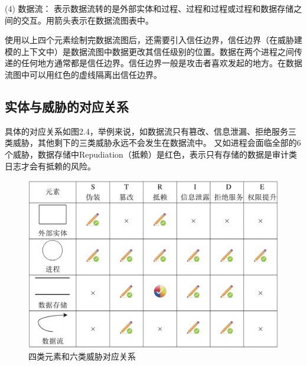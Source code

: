 (4) 数据流：
表示数据流转的是外部实体和过程、过程和过程或过程和数据存储之间的交互。用箭头表示在数据流图表中。

使用以上四个元素绘制完数据流图后，还需要引入信任边界，信任边界（在威胁建模的上下文中）是数据流图中数据更改其信任级别的位置。数据在两个进程之间传递的任何地方通常都是信任边界。信任边界一般是攻击者喜欢发起的地方。在数据流图中可以用红色的虚线隔离出信任边界。



\subsection{实体与威胁的对应关系}

具体的对应关系如图2.4，举例来说，如数据流只有篡改、信息泄漏、拒绝服务三类威胁，其他剩下的三类威胁永远不会发生在数据流中。
又如进程会面临全部的6个威胁，数据存储中Repudiation（抵赖）是红色，表示只有存储的数据是审计类日志才会有抵赖的风险。
\begin{figure}
    \centering
    \includegraphics[scale=0.6]{resources/img/i77.png}
    \caption{四类元素和六类威胁对应关系}
  \end{figure}

